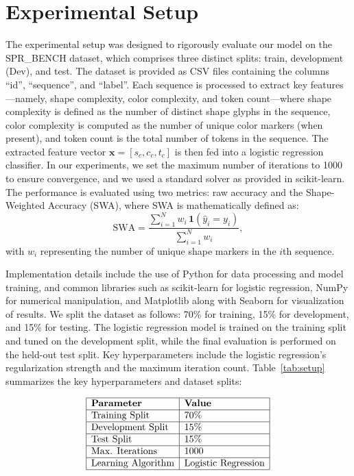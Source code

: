 \documentclass{article}
\begin{document}
\section{Experimental Setup}
The experimental setup was designed to rigorously evaluate our model on the SPR\_BENCH dataset, which comprises three distinct splits: train, development (Dev), and test. The dataset is provided as CSV files containing the columns “id”, “sequence”, and “label”. Each sequence is processed to extract key features—namely, shape complexity, color complexity, and token count—where shape complexity is defined as the number of distinct shape glyphs in the sequence, color complexity is computed as the number of unique color markers (when present), and token count is the total number of tokens in the sequence. The extracted feature vector \(\mathbf{x} = [s_c, c_c, t_c]\) is then fed into a logistic regression classifier. In our experiments, we set the maximum number of iterations to 1000 to ensure convergence, and we used a standard solver as provided in scikit-learn. The performance is evaluated using two metrics: raw accuracy and the Shape-Weighted Accuracy (SWA), where SWA is mathematically defined as:
\[
\mathrm{SWA} = \frac{\sum_{i=1}^{N} w_i \, \mathbf{1}(\hat{y}_i = y_i)}{\sum_{i=1}^{N} w_i},
\]
with \(w_i\) representing the number of unique shape markers in the \(i\)th sequence.

Implementation details include the use of Python for data processing and model training, and common libraries such as scikit-learn for logistic regression, NumPy for numerical manipulation, and Matplotlib along with Seaborn for visualization of results. We split the dataset as follows: 70\% for training, 15\% for development, and 15\% for testing. The logistic regression model is trained on the training split and tuned on the development split, while the final evaluation is performed on the held-out test split. Key hyperparameters include the logistic regression’s regularization strength and the maximum iteration count. Table~\ref{tab:setup} summarizes the key hyperparameters and dataset splits:

\[
\begin{array}{|l|l|}
\hline
\textbf{Parameter} & \textbf{Value} \\
\hline
\text{Training Split} & 70\% \\
\hline
\text{Development Split} & 15\% \\
\hline
\text{Test Split} & 15\% \\
\hline
\text{Max. Iterations} & 1000 \\
\hline
\text{Learning Algorithm} & \text{Logistic Regression} \\
\hline
\end{array}
\]
\end{document}
